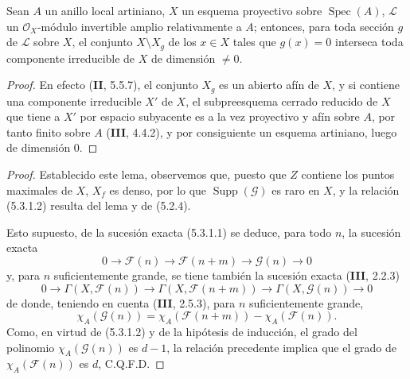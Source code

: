 \begin{lemma}[5.3.1.3]
\label{IV.2.s5.3.1.3-fr}
Sean $A$ un anillo local artiniano, $X$ un esquema proyectivo sobre
$\operatorname{Spec}(A)$, $\mathcal L$ un $\mathcal O_X$-módulo invertible
amplio relativamente a $A$; entonces, para toda sección $g$ de $\mathcal L$
sobre $X$, el conjunto $X\setminus X_g$ de los $x\in X$ tales que $g(x)=0$ interseca
toda componente irreducible de $X$ de dimensión $\ne0$.
\end{lemma}

\begin{proof}
En efecto (\textbf{II}, 5.5.7), el conjunto $X_g$ es un abierto afín de $X$, y si
contiene una componente irreducible $X'$ de $X$, el subpreesquema cerrado
reducido de $X$ que tiene a $X'$ por espacio subyacente es a la vez proyectivo
y afín sobre $A$, por tanto finito sobre $A$ (\textbf{III}, 4.4.2), y por consiguiente
un esquema artiniano, luego de dimensión $0$.
\end{proof}

\begin{proof}
Establecido este lema, observemos que, puesto que $Z$ contiene los puntos
maximales de $X$, $X_f$ es denso, por lo que
$\operatorname{Supp}(\mathcal G)$ es raro en $X$, y la relación (5.3.1.2)
resulta del lema y de (5.2.4).


Esto supuesto, de la sucesión exacta (5.3.1.1) se deduce, para todo $n$, la
sucesión exacta
\[
0\longrightarrow\mathcal F(n)\longrightarrow\mathcal F(n+m)
\longrightarrow\mathcal G(n)\longrightarrow0
\]
y, para $n$ suficientemente grande, se tiene también la sucesión exacta
(\textbf{III}, 2.2.3)
\[
0\longrightarrow\Gamma(X,\mathcal F(n))
\longrightarrow\Gamma(X,\mathcal F(n+m))
\longrightarrow\Gamma(X,\mathcal G(n))\longrightarrow0
\]
de donde, teniendo en cuenta (\textbf{III}, 2.5.3), para $n$ suficientemente grande,
\[
\chi_A(\mathcal G(n))
=\chi_A(\mathcal F(n+m))-\chi_A(\mathcal F(n)).
\]
Como, en virtud de (5.3.1.2) y de la hipótesis de inducción, el grado del
polinomio $\chi_A(\mathcal G(n))$ es $d-1$, la relación precedente implica
que el grado de $\chi_A(\mathcal F(n))$ es $d$, C.Q.F.D.
\end{proof}
